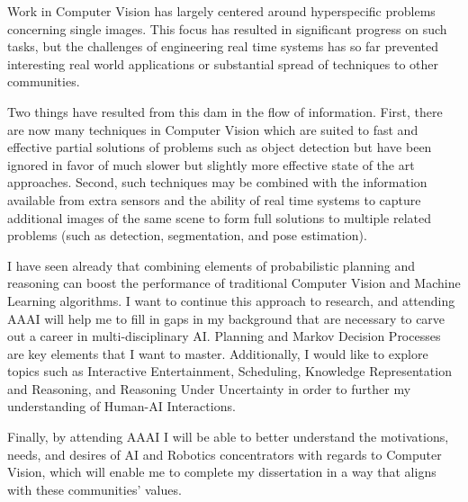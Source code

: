 \documentclass[12pt]{article}
\numberwithin{equation}{section}
\numberwithin{table}{section}
\numberwithin{figure}{section}
\begin{document}
  Work in Computer Vision has largely centered around hyperspecific problems concerning
single images. This focus has resulted in significant progress on such tasks, but the challenges of 
engineering real time systems has so far prevented interesting real world applications
or substantial spread of techniques to other communities. 

Two things have resulted from this dam in the flow of information. 
First, there are now many techniques in Computer Vision which are suited
to fast and effective partial solutions of problems such as object detection
but have been ignored in favor of much slower but slightly more effective state of the art
approaches.  Second, such techniques may be combined with the information available from
extra sensors and the ability of real time systems to capture additional images of the same scene
to form full solutions to multiple related problems (such as detection, segmentation, and pose estimation). 
 
I have seen already that combining elements of probabilistic planning and reasoning can boost
the performance of traditional Computer Vision and Machine Learning algorithms.  I want to
continue this approach to research, and attending AAAI will help me to fill in gaps in my
background that are necessary to carve out a career in multi-disciplinary AI.  
Planning and Markov Decision Processes are key elements that I want to master. Additionally,
I would like to explore topics such as Interactive Entertainment, Scheduling, Knowledge
Representation and Reasoning, and Reasoning Under Uncertainty in order to further my
understanding of Human-AI Interactions.

Finally, by attending AAAI I will be able to better understand the motivations, needs, and desires 
of AI and Robotics concentrators with regards to Computer Vision, which will enable me 
to complete my dissertation in a way that aligns with these communities' values.

\newpage
\end{document}
